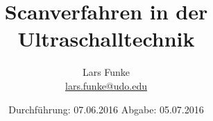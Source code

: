 
\author{
  Lars Funke
  \texorpdfstring{
    \\
    \href{mailto:lars.funke@udo.edu}{lars.funke@udo.edu}
  }{}%
}
\subject{US2}
\title{Scanverfahren in der Ultraschalltechnik}
\date{
  Durchführung: 07.06.2016
  \hspace{3em}
  Abgabe: 05.07.2016
}



\maketitle
\newpage
\mbox{}
\newpage
\thispagestyle{empty}
\tableofcontents
\newpage






\nocite{numpy}
\nocite{matplotlib}
\printbibliography


